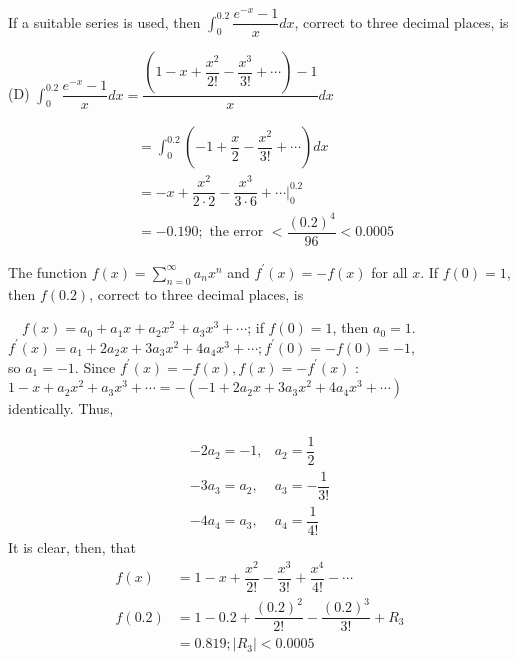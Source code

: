 \question
If a suitable series is used, then $\displaystyle\int_{0}^{0.2} \dfrac{e^{-x}-1}{x} d x$, correct to three decimal places, is
\begin{choices}
\end{choices}
\begin{solution}
(D) $\displaystyle\int_{0}^{0.2} \dfrac{e^{-x}-1}{x} d x=\dfrac{\left(1-x+\dfrac{x^{2}}{2!}-\dfrac{x^{3}}{3!}+\cdots\right)-1}{x} d x$

\[
\begin{aligned}
& =\displaystyle\int_{0}^{0.2}\left(-1+\dfrac{x}{2}-\dfrac{x^{2}}{3!}+\cdots\right) d x \\
& =-x+\dfrac{x^{2}}{2 \cdot 2}-\dfrac{x^{3}}{3 \cdot 6}+\left.\cdots\right|_{0} ^{0.2} \\
& =-0.190 ; \text { the error }<\dfrac{(0.2)^{4}}{96}<0.0005
\end{aligned}
\]


\end{solution}

\question
The function $f(x)=\sum\limits_{n=0}^{\infty} a_{n} x^{n}$ and $f^{\prime}(x)=-f(x)$ for all $x$. If $f(0)=1$, then $f(0.2)$, correct to three decimal places, is
\begin{choices}
\end{choices}
\begin{solution}
$\quad f(x)=a_{0}+a_{1} x+a_{2} x^{2}+a_{3} x^{3}+\cdots$; if $f(0)=1$, then $a_{0}=1$.\\
$f^{\prime}(x)=a_{1}+2 a_{2} x+3 a_{3} x^{2}+4 a_{4} x^{3}+\cdots ; f^{\prime}(0)=-f(0)=-1$,\\
so $a_{1}=-1$. Since $f^{\prime}(x)=-f(x), f(x)=-f^{\prime}(x)$ :\\
$1-x+a_{2} x^{2}+a_{3} x^{3}+\cdots=-\left(-1+2 a_{2} x+3 a_{3} x^{2}+4 a_{4} x^{3}+\cdots\right)$\\
identically. Thus,


\[
\begin{array}{ll}
-2 a_{2}=-1, & a_{2}=\dfrac{1}{2} \\
-3 a_{3}=a_{2}, & a_{3}=-\dfrac{1}{3!} \\
-4 a_{4}=a_{3}, & a_{4}=\dfrac{1}{4!}
\end{array}
\]
It is clear, then, that
\[
\begin{aligned}
f(x) & =1-x+\dfrac{x^{2}}{2!}-\dfrac{x^{3}}{3!}+\dfrac{x^{4}}{4!}-\cdots \\
f(0.2) & =1-0.2+\dfrac{(0.2)^{2}}{2!}-\dfrac{(0.2)^{3}}{3!}+R_{3} \\
& =0.819 ;\left|R_{3}\right|<0.0005
\end{aligned}
\]
\end{solution}



